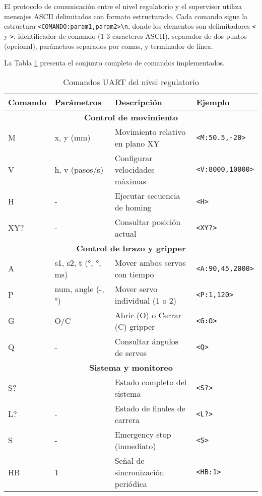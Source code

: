 El protocolo de comunicación entre el nivel regulatorio y el supervisor utiliza mensajes ASCII delimitados con formato estructurado. Cada comando sigue la estructura \texttt{<COMANDO:param1,param2>\textbackslash n}, donde los elementos son delimitadores \texttt{<} y \texttt{>}, identificador de comando (1-3 caracteres ASCII), separador de dos puntos (opcional), parámetros separados por comas, y terminador de línea.

La Tabla \ref{tab:comandos_uart} presenta el conjunto completo de comandos implementados.

\begin{table}[H]
\centering
\small
\begin{tabular}{|l|l|p{4.5cm}|l|}
\hline
\textbf{Comando} & \textbf{Parámetros} & \textbf{Descripción} & \textbf{Ejemplo} \\
\hline
\multicolumn{4}{|c|}{\textbf{Control de movimiento}} \\
\hline
M & x, y (mm) & Movimiento relativo en plano XY & \texttt{<M:50.5,-20>} \\
\hline
V & h, v (pasos/s) & Configurar velocidades máximas & \texttt{<V:8000,10000>} \\
\hline
H & - & Ejecutar secuencia de homing & \texttt{<H>} \\
\hline
XY? & - & Consultar posición actual & \texttt{<XY?>} \\
\hline
\multicolumn{4}{|c|}{\textbf{Control de brazo y gripper}} \\
\hline
A & s1, s2, t (°, °, ms) & Mover ambos servos con tiempo & \texttt{<A:90,45,2000>} \\
\hline
P & num, angle (-, °) & Mover servo individual (1 o 2) & \texttt{<P:1,120>} \\
\hline
G & O/C & Abrir (O) o Cerrar (C) gripper & \texttt{<G:O>} \\
\hline
Q & - & Consultar ángulos de servos & \texttt{<Q>} \\
\hline
\multicolumn{4}{|c|}{\textbf{Sistema y monitoreo}} \\
\hline
S? & - & Estado completo del sistema & \texttt{<S?>} \\
\hline
L? & - & Estado de finales de carrera & \texttt{<L?>} \\
\hline
S & - & Emergency stop (inmediato) & \texttt{<S>} \\
\hline
HB & 1 & Señal de sincronización periódica & \texttt{<HB:1>} \\
\hline
\end{tabular}
\caption{Comandos UART del nivel regulatorio}
\label{tab:comandos_uart}
\end{table}

